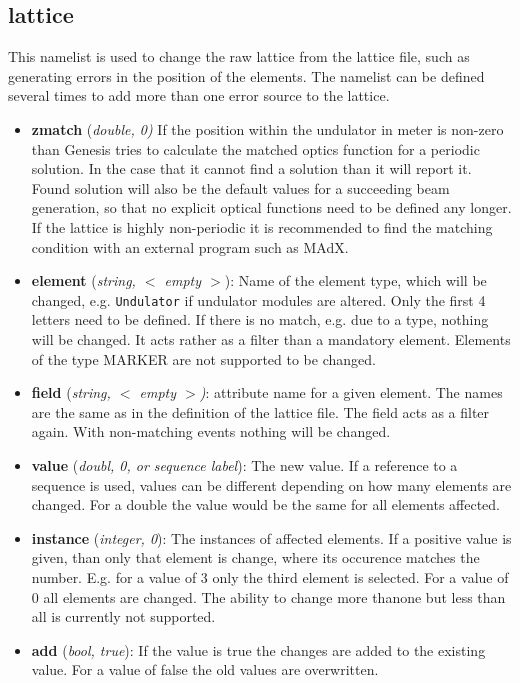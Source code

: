 \documentclass[12pt]{book}
\begin{document}
\subsection{\sf lattice}

This namelist is used to change the raw lattice from the lattice file, such as generating errors in the position of the elements. The namelist can be defined several times to add more than one error source to the lattice.

\begin{itemize}
\item {\bf zmatch} ({\it double, 0)} If the position within the undulator in meter is non-zero than Genesis tries to calculate the matched optics function for a periodic solution. In the case that it cannot find a solution than it will report it. Found solution will also be the default values for a succeeding beam generation, so that no explicit optical functions need to be defined any longer. If the lattice is highly non-periodic it is recommended to find the matching condition with an external program such as MAdX.
\item {\bf element} ({\it string, $<$ empty $>$}): Name of the element type, which will be changed, e.g. {\tt Undulator} if undulator modules are altered. Only the first 4 letters need to be defined. If there is no match, e.g. due to a type, nothing will be changed. It acts rather as a filter than a mandatory element. Elements of the type MARKER are not supported to be changed.
\item {\bf  field} ({\it string, $<$ empty $>$)}: attribute name for a given element. The names are the same as in the definition of the lattice file. The field acts as a filter again. With non-matching events nothing will be changed.
\item {\bf value} ({\it doubl, 0, or sequence label}): The new value. If a reference to a sequence is used, values can be different depending on how many elements are changed. For a double the value would be the same for all elements affected.
\item {\bf instance} ({\it integer, 0}): The instances of affected elements. If a positive value is given, than only that element is change, where its occurence matches the number. E.g. for a value of 3 only the third element is selected. For a value of 0 all elements are changed. The ability to change more thanone but less than all is currently not supported.
\item {\bf add} ({\it bool, true}): If the value is true the changes are added to the existing value. For a value of false the old values are overwritten.
\end{itemize}
\end{document}
